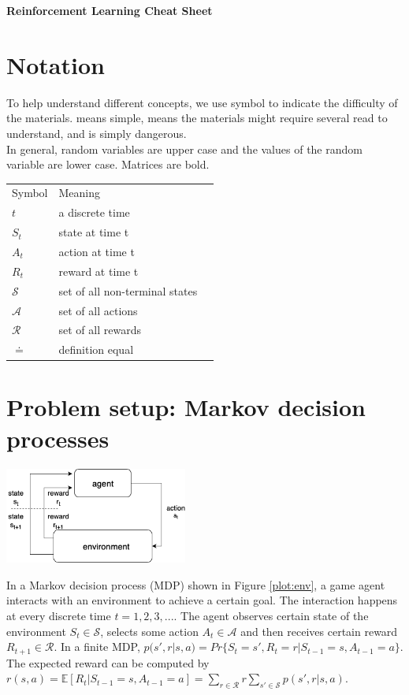 \documentclass{article}
\begin{document}
	\begin{multicols*}{2}
	\begin{center}
		{\huge{\textbf{Reinforcement Learning Cheat Sheet}}}
	\end{center}
	\section*{Notation}
		To help understand different concepts, we use symbol   to indicate the difficulty of the materials.  means simple, \ding{56} means the materials might require several read to understand, and \ding{56} is simply dangerous. \\
		
		In general, random variables are upper case and the values of the random variable are lower case. Matrices are bold. \\
		
		\begin{tabular}{lp{5cm} l}
		Symbol   & Meaning \\
		$t$ & a discrete time\\
		$S_t$ & state at time t \\
		$A_t$ & action at time t \\
		$R_t$ & reward at time t \\
		$\mathcal{S}$ & set of all non-terminal states \\
		$ \mathcal{A}$ & set of all actions \\
		$ \mathcal{R}$ & set of all rewards \\
		$ \doteq $ & definition equal 
		\end{tabular}

		\section*{Problem setup: Markov decision processes}
		\begin{center}
		\includegraphics[width=6cm]{../img/env.png}
		\label{plot:env}
		\end{center}
		
		 In a Markov decision process (MDP) shown in Figure \ref{plot:env}, a game agent interacts with an environment to achieve a certain goal. The interaction happens at every discrete time $ t = 1, 2, 3, ... $. The agent observes certain state of the environment $ S_t \in \mathcal{S} $, selects some action $ A_t \in \mathcal{A} $ and then receives certain reward $ R_{t+1} \in \mathcal{R} $. In a finite MDP, $ p(s', r|s, a) = Pr\{S_t=s', R_t=r | S_{t-1}=s, A_{t-1}=a \} $. The expected reward can be computed by $ r(s, a) = \mathbb{E}[R_t |S_{t-1} = s,A_{t-1}=a] = \sum_{r \in \mathcal{R}}r \sum_{s' \in \mathcal{S}} p(s', r | s, a) $.  \\
		

\end{multicols*}
\end{document}
